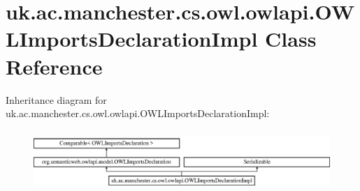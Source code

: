 \hypertarget{classuk_1_1ac_1_1manchester_1_1cs_1_1owl_1_1owlapi_1_1_o_w_l_imports_declaration_impl}{\section{uk.\-ac.\-manchester.\-cs.\-owl.\-owlapi.\-O\-W\-L\-Imports\-Declaration\-Impl Class Reference}
\label{classuk_1_1ac_1_1manchester_1_1cs_1_1owl_1_1owlapi_1_1_o_w_l_imports_declaration_impl}
}
Inheritance diagram for uk.\-ac.\-manchester.\-cs.\-owl.\-owlapi.\-O\-W\-L\-Imports\-Declaration\-Impl\-:\begin{figure}[H]
\begin{center}
\leavevmode
\includegraphics[height=2.339833cm]{classuk_1_1ac_1_1manchester_1_1cs_1_1owl_1_1owlapi_1_1_o_w_l_imports_declaration_impl}
\end{center}
\end{figure}
